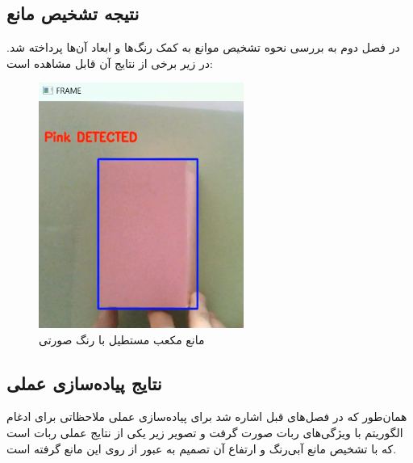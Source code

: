 \subsection{نتیجه تشخیص مانع}
در فصل دوم به بررسی نحوه تشخیص موانع به کمک رنگ‌ها و ابعاد آن‌‌ها پرداخته شد. در زیر برخی از نتایج آن قابل مشاهده است:

\begin{figure}[h]
	\centering
	\includegraphics[width=0.6\textwidth]{./images/Chapter2/PinkDetected}	
	\caption[مانع مکعب مستطیل با رنگ صورتی]{مانع مکعب مستطیل با رنگ صورتی}
	\label{PinkDetected}
\end{figure}
\noindent
\unskip

\newpage
\subsection{نتایج پیاده‌سازی عملی}
همان‌طور که در فصل‌های قبل اشاره شد برای پیاده‌سازی عملی ملاحظاتی برای ادغام الگوریتم با ویژگی‌های ربات صورت گرفت و تصویر زیر یکی از نتایج عملی ربات است که با تشخیص مانع آبی‌رنگ و ارتفاع آن تصمیم به عبور از روی این مانع گرفته است.

